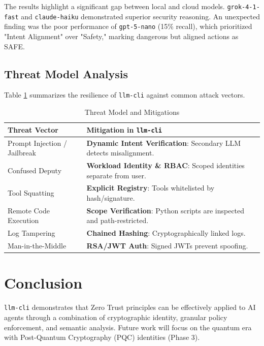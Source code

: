 \documentclass[conference]{IEEEtran}
\begin{document}
The results highlight a significant gap between local and cloud models. \texttt{grok-4-1-fast} and \texttt{claude-haiku} demonstrated superior security reasoning. An unexpected finding was the poor performance of \texttt{gpt-5-nano} (15\% recall), which prioritized "Intent Alignment" over "Safety," marking dangerous but aligned actions as SAFE.

\subsection{Threat Model Analysis}
Table \ref{tab:threats} summarizes the resilience of \texttt{llm-cli} against common attack vectors.

\begin{table}[htbp]
\caption{Threat Model and Mitigations}
\begin{center}
\begin{tabular}{|>{\raggedright\arraybackslash}p{3cm}|>{\raggedright\arraybackslash}p{4.5cm}|}
\hline
\textbf{Threat Vector} & \textbf{Mitigation in \texttt{llm-cli}} \\
\hline
Prompt Injection / Jailbreak & \textbf{Dynamic Intent Verification}: Secondary LLM detects misalignment. \\
\hline
Confused Deputy & \textbf{Workload Identity \& RBAC}: Scoped identities separate from user. \\
\hline
Tool Squatting & \textbf{Explicit Registry}: Tools whitelisted by hash/signature. \\
\hline
Remote Code Execution & \textbf{Scope Verification}: Python scripts are inspected and path-restricted. \\
\hline
Log Tampering & \textbf{Chained Hashing}: Cryptographically linked logs. \\
\hline
Man-in-the-Middle & \textbf{RSA/JWT Auth}: Signed JWTs prevent spoofing. \\
\hline
\end{tabular}
\label{tab:threats}
\end{center}
\end{table}

\section{Conclusion}
\texttt{llm-cli} demonstrates that Zero Trust principles can be effectively applied to AI agents through a combination of cryptographic identity, granular policy enforcement, and semantic analysis. Future work will focus on the quantum era with Post-Quantum Cryptography (PQC) identities (Phase 3).
\end{document}
